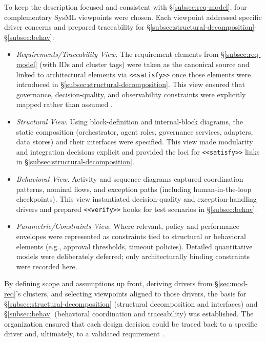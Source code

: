 To keep the description focused and consistent with §\ref{subsec:req-model}, four complementary SysML viewpoints were chosen. Each viewpoint addressed specific driver concerns and prepared traceability for §\ref{subsec:structural-decomposition}-§\ref{subsec:behav}:
\begin{itemize}
\item \emph{Requirements/Traceability View.} The requirement elements from §\ref{subsec:req-model} (with IDs and cluster tags) were taken as the canonical source and linked to architectural elements via \texttt{<<satisfy>>} once those elements were introduced in §\ref{subsec:structural-decomposition}. This view ensured that governance, decision-quality, and observability constraints were explicitly mapped rather than assumed \parencite{IEEEStandard1990}.
\item \emph{Structural View.} Using block-definition and internal-block diagrams, the static composition (orchestrator, agent roles, governance services, adapters, data stores) and their interfaces were specified. This view made modularity and integration decisions explicit and provided the loci for \texttt{<<satisfy>>} links in §\ref{subsec:structural-decomposition}.
\item \emph{Behavioral View.} Activity and sequence diagrams captured coordination patterns, nominal flows, and exception paths (including human-in-the-loop checkpoints). This view instantiated decision-quality and exception-handling drivers and prepared \texttt{<<verify>>} hooks for test scenarios in §\ref{subsec:behav}.
\item \emph{Parametric/Constraints View.} Where relevant, policy and performance envelopes were represented as constraints tied to structural or behavioral elements (e.g., approval thresholds, timeout policies). Detailed quantitative models were deliberately deferred; only architecturally binding constraints were recorded here.
\end{itemize}

By defining scope and assumptions up front, deriving drivers from §\ref{sec:mod-req}'s clusters, and selecting viewpoints aligned to those drivers, the basis for §\ref{subsec:structural-decomposition} (structural decomposition and interfaces) and §\ref{subsec:behav} (behavioral coordination and traceability) was established. The organization ensured that each design decision could be traced back to a specific driver and, ultimately, to a validated requirement \parencite{IEEEStandard1990,peffersDesign2007}.

